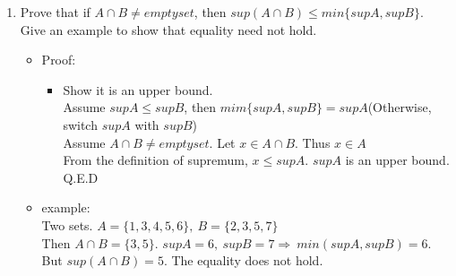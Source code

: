 \documentclass[]{exam}
\begin{document}
\begin{questions}
\begin{enumerate}[label = (\alph*)]
	\item Prove that if $A \cap B \neq emptyset$, then $sup(A \cap B) \leq min\{supA, supB\}$. Give an example to show that equality need not hold.
	\begin{itemize}
		\item Proof:
		\begin{itemize}
			\item Show it is an upper bound.
			\\ Assume $supA \leq supB$, then $mim\{supA, supB\} = supA$(Otherwise, switch $supA$ with $supB$)
			\\ Assume $A \cap B \neq emptyset$. Let $x \in A \cap B$. Thus $x \in A$
			\\ From the definition of supremum, $x \leq supA$. $supA$ is an upper bound. Q.E.D
		\end{itemize}

		\item example:
		\\ Two sets. $A = \{1, 3, 4, 5, 6\},\ B = \{2, 3, 5, 7\}$
		\\ Then $A \cap B = \{3, 5\}$. $supA = 6,\ supB = 7 \Rightarrow \ min(supA, supB) = 6$. But $sup(A \cap B) = 5$. The equality does not hold.
	\end{itemize}
\end{enumerate}
\end{questions}
\end{document}
